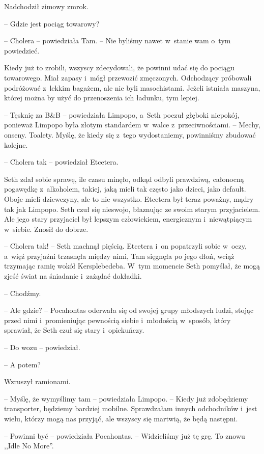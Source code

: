 \documentclass[oneside,polish,11pt,sfheadings]{mwbk}
\begin{document}
Nadchodził zimowy zmrok.

-- Gdzie jest pociąg towarowy?

-- Cholera -- powiedziała Tam. -- Nie byliśmy nawet w~stanie wam o~tym
powiedzieć.

Kiedy już to zrobili, wszyscy zdecydowali, że powinni udać się do
pociągu towarowego. Miał zapasy i~mógł przewozić zmęczonych. Odchodzący
próbowali podróżować z~lekkim bagażem, ale nie byli masochistami. Jeżeli
istniała maszyna, której można by użyć do przenoszenia ich ładunku, tym
lepiej.

-- Tęsknię za B\&B -- powiedziała Limpopo, a~Seth poczuł głęboki niepokój,
ponieważ Limpopo była złotym standardem w~walce z~przeciwnościami. -- Mechy, onseny. Toalety. Myślę, że kiedy się z~tego wydostaniemy,
powinniśmy zbudować kolejne.

-- Cholera tak -- powiedział Etcetera. 

Seth zdał sobie sprawę, ile czasu
minęło, odkąd odbyli prawdziwą, całonocną pogawędkę z~alkoholem, takiej,
jaką mieli tak często jako dzieci, jako default. Oboje mieli dziewczyny,
ale to nie wszystko. Etcetera był teraz poważny, mądry tak jak Limpopo.
Seth czuł się nieswojo, błaznując ze swoim starym przyjacielem. Ale jego
stary przyjaciel był lepszym człowiekiem, energicznym i~niewątpiącym w~siebie. Znosił do dobrze.

-- Cholera tak! -- Seth machnął pięścią. Etcetera i~on popatrzyli sobie w~oczy, a~więź przyjaźni trzasnęła między nimi, Tam sięgnęła po jego dłoń,
wciąż trzymając ramię wokół Kersplebedeba. W~tym momencie Seth pomyślał,
że mogą zjeść świat na śniadanie i~zażądać dokładki. 

-- Chodźmy.

-- Ale gdzie? -- Pocahontas oderwała się od swojej grupy młodszych ludzi,
stojąc przed nimi i~promieniując pewnością siebie i~młodością w~sposób,
który sprawiał, że Seth czuł się stary i~opiekuńczy.

-- Do wozu -- powiedział.

-- A potem?

Wzruszył ramionami.

-- Myślę, że wymyślimy tam -- powiedziała Limpopo. -- Kiedy już zdobędziemy
transporter, będziemy bardziej mobilne. Sprawdzałam innych odchodników i~jest wielu, którzy mogą nas przyjąć, ale wszyscy się martwią, że będą
następni.

-- Powinni być -- powiedziała Pocahontas. -- Widzieliśmy już tę grę. To
znowu ,,Idle No More''. 
\end{document}
